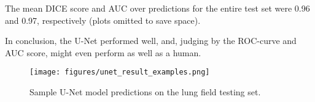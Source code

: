 The mean DICE score and AUC over predictions for the entire test set were 0.96
and 0.97, respectively (plots omitted to save space).

In conclusion, the U-Net performed well, and, judging by the ROC-curve and AUC
score, might even perform as well as a human.

\begin{figure}
\vspace{-0.5cm}
  \centering
  \texttt{[image: figures/unet\_result\_examples.png]}
  \caption{{\footnotesize Sample U-Net model predictions on the lung field testing set.
  }}
  \label{fig:unet_results}
\vspace{-0.6cm}
\end{figure}


%
%
%
%

